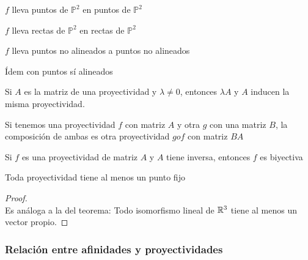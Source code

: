 \begin{nprop}[Propiedades de $f$]\hfill
	\begin{nlist}
	\item $f$ lleva puntos de $\mathbb P^2$ en puntos de $\mathbb P^2$
	\item $f$ lleva rectas de $\mathbb P^2$ en rectas de $\mathbb P^2$
	\item $f$ lleva puntos no alineados a puntos no alineados
	\item Ídem con puntos sí alineados
\end{nlist}
\end{nprop}

\begin{nprop}
	Si $A$ es la matriz de una proyectividad y $\lambda \ne 0$, entonces $\lambda A$ y $A$ inducen la misma proyectividad.
\end{nprop}

\begin{nprop}
	Si tenemos una proyectividad $f$ con matriz $A$ y otra $g$ con una matriz $B$, la composición de ambas es otra proyectividad $go f$ con matriz $BA$
\end{nprop}

\begin{nprop}
	Si $f$ es una proyectividad de matriz $A$ y $A$ tiene inversa, entonces $f$ es biyectiva
\end{nprop}

\begin{nth}
	Toda proyectividad tiene al menos un punto fijo
\end{nth}
\begin{proof}\hfill\\
Es análoga a la del teorema: Todo isomorfismo lineal de $\mathbb{R}^3$ tiene al menos un vector propio.
\end{proof}
\subsubsection{Relación entre afinidades y proyectividades}

